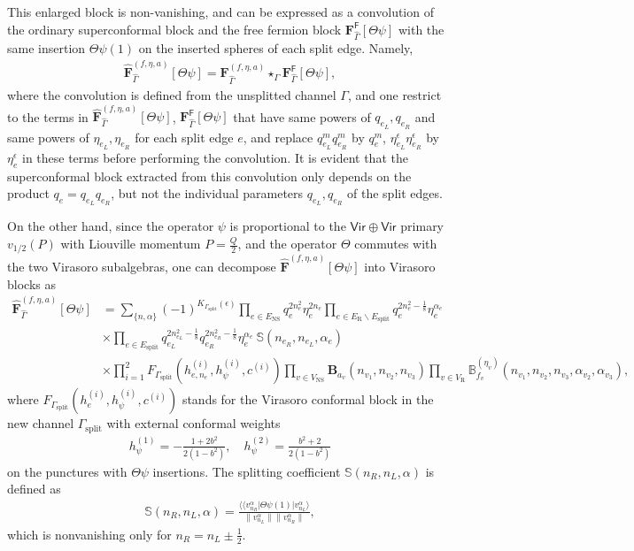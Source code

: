 \documentclass[12pt]{article}
\def\ie{\begin{equation}\begin{aligned}}
\def\fe{\end{aligned}\end{equation}}
\def\NS{\mathrm{NS}}
\def\R{\mathrm{R}}
\begin{document}
This enlarged block is non-vanishing, and can be expressed as a convolution of the ordinary superconformal block and the free fermion block $\mathbf{F}^{\mathsf{F}}_{\hat{\Gamma}}[\Theta \psi]$ with the same insertion $\Theta \psi(1)$ on the inserted spheres of each split edge. Namely,
\ie \label{Insconv}
\widehat{\mathbf{F}}^{(f,\eta,a)}_{\hat{\Gamma}}[\Theta \psi] = {\mathbf{F}}^{(f,\eta,a)}_{\hat{\Gamma}} \star_{{\Gamma}} \mathbf{F}^{\mathsf{F}}_{\hat{\Gamma}}[\Theta \psi],
\fe
where the convolution is defined from the unsplitted channel $\Gamma$, and one restrict to the terms in $\widehat{\mathbf{F}}^{(f,\eta,a)}_{\hat{\Gamma}}[\Theta \psi]$, $\mathbf{F}^{\mathsf{F}}_{\hat{\Gamma}}[\Theta \psi]$ that have same powers of $q_{e_L}, q_{e_R}$ and same powers of $\eta_{e_L}, \eta_{e_R}$ for each split edge $e$, and replace $q_{e_L}^m q_{e_R}^m$ by $q_e^m$, $\eta_{e_L}^\epsilon \eta_{e_R}^\epsilon$ by $\eta_{e}^\epsilon$ in these terms before performing the convolution. It is evident that the superconformal block extracted from this convolution only depends on the product $q_{e}=q_{e_L}q_{e_R}$, but not the individual parameters $q_{e_L},q_{e_R}$ of the split edges.

On the other hand, since the operator $\psi$ is proportional to the $\mathsf{Vir\oplus Vir}$ primary $v_{1/2}(P)$ with Liouville momentum $P=\frac{Q}{2}$, and the operator $\Theta$ commutes with the two Virasoro subalgebras, one can decompose $\widehat{\mathbf{F}}^{(f,\eta,a)}[\Theta \psi]$ into Virasoro blocks as
 \ie
\widehat{\mathbf{F}}^{(f,\eta,a)}_{\hat{\Gamma}}[\Theta \psi]&= \sum_{\{n,\alpha\}} (-1)^{K_{{\Gamma}_{\mathrm{split}}}(\epsilon)} \prod_{e\in E_\NS} q_e^{2n_e^2}\eta_e^{2n_e} \prod_{e\in E_\R\backslash E_\mathrm{split}} q_e^{2n_e^2-\frac{1}{8}}\eta_e^{\alpha_e}\\
&\times \prod_{e\in E_\mathrm{split}} q_{e_L}^{2n_{e_L}^2-\frac{1}{8}}q_{e_R}^{2n_{e_R}^2-\frac{1}{8}} \eta_e^{\alpha_e}\ \mathbb{S}(n_{e_R}, n_{e_L}, \alpha_e)\\
&\times \prod_{i=1}^2 F_{\Gamma_{\mathrm{split}}}(h_{e, n_e}^{(i)},h_\psi^{(i)}, c^{(i)}) \prod_{v\in V_\NS} \mathbf{B}_{a_v}(n_{v_1},n_{v_2},n_{v_3}) \prod_{v\in V_\R} \mathbb{B}_{f_v}^{(\eta_v)}(n_{v_1},n_{v_2},n_{v_3},\alpha_{v_2},\alpha_{v_3}),
\fe   
where $F_{\Gamma_{\mathrm{split}}}(h_{e}^{(i)},h_\psi^{(i)}, c^{(i)})$ stands for the Virasoro conformal block in the new channel $\Gamma_{\mathrm{split}}$ with external conformal weights
\ie 
h_\psi^{(1)}=-\frac{1+2 b^2}{2\left(1-b^2\right)}, \quad h_\psi^{(2)}=\frac{b^2+2}{2\left(1-b^2\right)}
\fe
on the punctures with $\Theta \psi$ insertions. The splitting coefficient $\mathbb{S}(n_R,n_L,\alpha)$ is defined as
\ie
\mathbb{S}(n_R, n_L,\alpha) = \frac{\langle \langle v_{n_R}^\alpha|\Theta \psi(1)|v_{n_L}^{\alpha}\rangle}{\|v_{n_L}^{\alpha}\|\|v_{n_R}^{\alpha}\|},
\fe
which is nonvanishing only for $n_R = n_L \pm \frac{1}{2}$.
\end{document}
